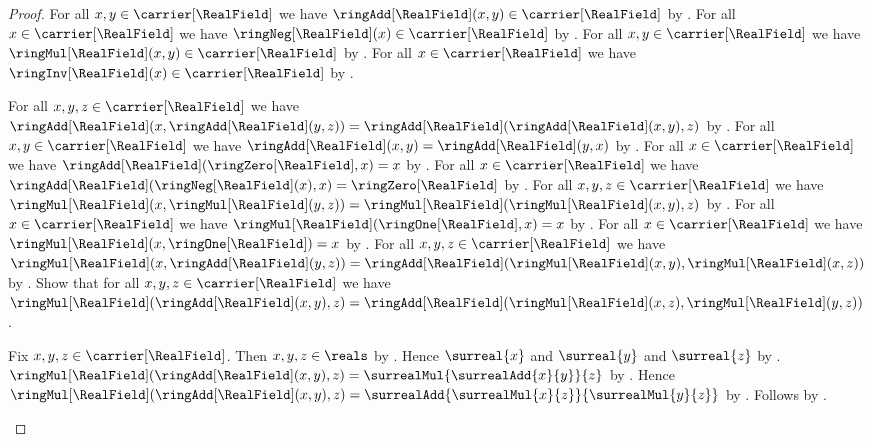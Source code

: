 \begin{proof}
    For all $x,y\in\carrier[\RealField]$ we have
        $\ringAdd[\RealField](x,y)\in\carrier[\RealField]$
        by .
    For all $x\in\carrier[\RealField]$ we have
        $\ringNeg[\RealField](x)\in\carrier[\RealField]$
        by .
    For all $x,y\in\carrier[\RealField]$ we have
        $\ringMul[\RealField](x,y)\in\carrier[\RealField]$
        by .
    For all $x\in\carrier[\RealField]$ we have
        $\ringInv[\RealField](x)\in\carrier[\RealField]$
        by .

    For all $x,y,z\in\carrier[\RealField]$ we have
        $\ringAdd[\RealField](x,\ringAdd[\RealField](y,z))
            =\ringAdd[\RealField](\ringAdd[\RealField](x,y),z)$
        by .
    For all $x,y\in\carrier[\RealField]$ we have
        $\ringAdd[\RealField](x,y)=\ringAdd[\RealField](y,x)$
        by .
    For all $x\in\carrier[\RealField]$ we have
        $\ringAdd[\RealField](\ringZero[\RealField],x)=x$
        by .
    For all $x\in\carrier[\RealField]$ we have
        $\ringAdd[\RealField](\ringNeg[\RealField](x),x)
            =\ringZero[\RealField]$
        by
        .
    For all $x,y,z\in\carrier[\RealField]$ we have
        $\ringMul[\RealField](x,\ringMul[\RealField](y,z))
            =\ringMul[\RealField](\ringMul[\RealField](x,y),z)$
        by .
    For all $x\in\carrier[\RealField]$ we have
        $\ringMul[\RealField](\ringOne[\RealField],x)=x$
        by .
    For all $x\in\carrier[\RealField]$ we have
        $\ringMul[\RealField](x,\ringOne[\RealField])=x$
        by .
    For all $x,y,z\in\carrier[\RealField]$ we have
        $\ringMul[\RealField](x,\ringAdd[\RealField](y,z))
            =\ringAdd[\RealField]
                (\ringMul[\RealField](x,y),
                 \ringMul[\RealField](x,z))$
        by
        .
    Show that for all $x,y,z\in\carrier[\RealField]$ we have
        $\ringMul[\RealField](\ringAdd[\RealField](x,y),z)
            =\ringAdd[\RealField]
                (\ringMul[\RealField](x,z),
                 \ringMul[\RealField](y,z))$.
    \begin{subproof}
        Fix $x,y,z\in\carrier[\RealField]$.
        Then $x,y,z\in\reals$ by \auto.
        Hence $\surreal{x}$ and $\surreal{y}$ and $\surreal{z}$
            by .
        $\ringMul[\RealField](\ringAdd[\RealField](x,y),z)
            =\surrealMul{\surrealAdd{x}{y}}{z}$ by \auto.
        Hence $\ringMul[\RealField](\ringAdd[\RealField](x,y),z)
            =\surrealAdd{\surrealMul{x}{z}}{\surrealMul{y}{z}}$
            by .
        Follows by \auto.
    \end{subproof}


\end{proof}
